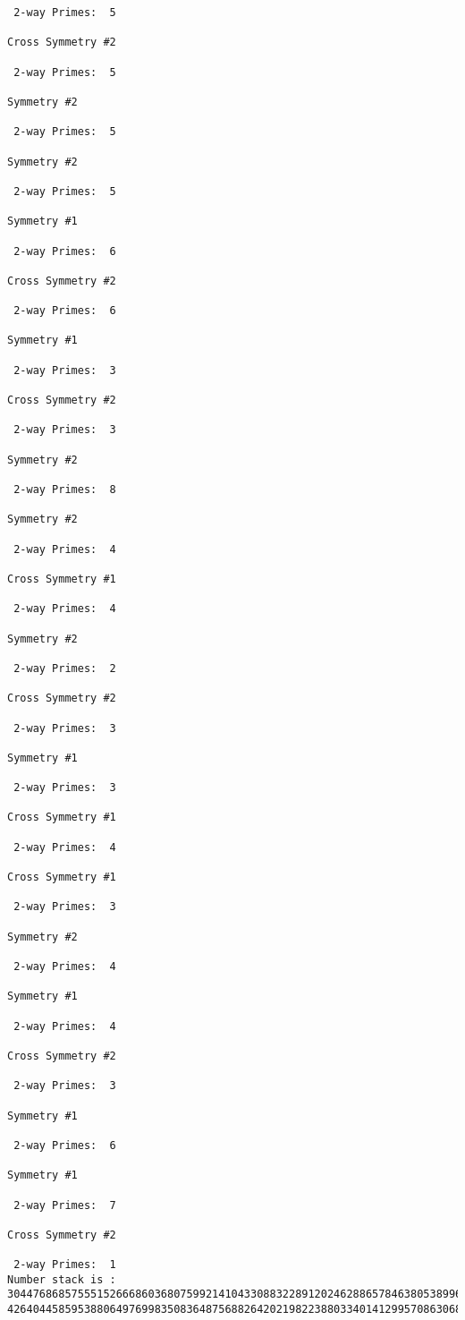 \begin{verbatim}
 2-way Primes: 	5

Cross Symmetry #2

 2-way Primes: 	5

Symmetry #2

 2-way Primes: 	5

Symmetry #2

 2-way Primes: 	5

Symmetry #1

 2-way Primes: 	6

Cross Symmetry #2

 2-way Primes: 	6

Symmetry #1

 2-way Primes: 	3

Cross Symmetry #2

 2-way Primes: 	3

Symmetry #2

 2-way Primes: 	8

Symmetry #2

 2-way Primes: 	4

Cross Symmetry #1

 2-way Primes: 	4

Symmetry #2

 2-way Primes: 	2

Cross Symmetry #2

 2-way Primes: 	3

Symmetry #1

 2-way Primes: 	3

Cross Symmetry #1

 2-way Primes: 	4

Cross Symmetry #1

 2-way Primes: 	3

Symmetry #2

 2-way Primes: 	4

Symmetry #1

 2-way Primes: 	4

Cross Symmetry #2

 2-way Primes: 	3

Symmetry #1

 2-way Primes: 	6

Symmetry #1

 2-way Primes: 	7

Cross Symmetry #2

 2-way Primes: 	1
Number stack is :
30447686857555152666860368075992141043308832289120246288657846380538996794608835958544046240163340857
42640445859538806497699835083648756882642021982238803340141299570863068666251555758686744037580433610


\end{verbatim}
